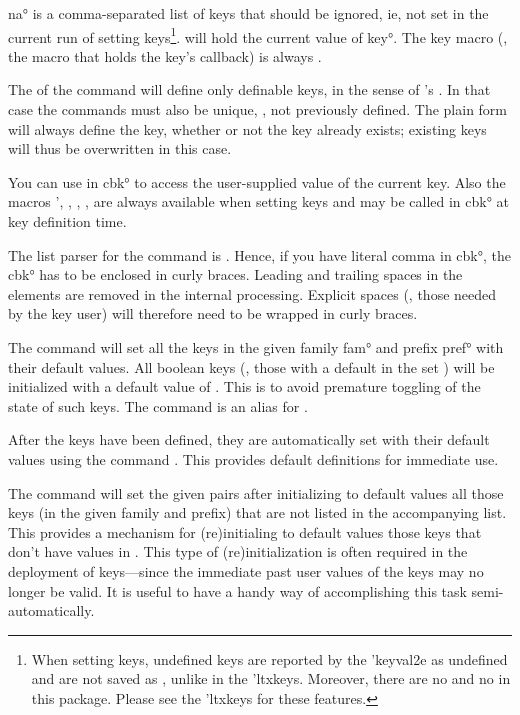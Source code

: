 \documentclass[
  use-a4-paper,
  use-10pt-font,
  final-version,
  use-UK-English,
  fancy-section-headings,
  frame-section-numbers,
  para-abstract-style,
  input-config-file,
  no-hyperref-messages
]{amltxdoc}
\begin{document}
\ang{na} is a comma-separated list of keys that should be ignored, ie, not set in the current run of setting keys\footnote{When setting keys, undefined keys are reported by the \pkg'{keyval2e} as undefined and are not saved as , unlike in the \pkg'{ltxkeys}. Moreover, there are no  and no  in this package. Please see the \pkg'{ltxkeys} for these features.}. \mpkey will hold the current value of \ang{key}. The key macro (\ie, the macro that holds the key's callback) is always \preffamkey.

The \stform of the command \fx{\kve@definekeys} will define only definable keys, in the sense of \latex's \hx{\newcommand}. In that case the commands \mpkey must also be unique, \ie, not previously defined. The plain form \fx{\kve@definekeys} will always define the key, whether or not the key already exists; existing keys will thus be overwritten in this case.

You can use  in \ang{cbk} to access the user-supplied value of the current key. Also the macros \ffx'{\currpref, \currfam, \currkey, \currval, \currkeyval} are always available when setting keys and may be called in \ang{cbk} at key definition time.

\Note The list parser for the command \fx{\kve@definekeys} is \qcomma. Hence, if you have literal comma in \ang{cbk}, the \ang{cbk} has to be enclosed in curly braces. Leading and trailing spaces in the elements are removed in the internal processing. Explicit spaces (\ie, those needed by the key user) will therefore need to be wrapped in curly braces.

The command \fx{\kve@setdefaults} will set all the keys in the given family \ang{fam} and prefix \ang{pref} with their default values. All boolean keys (\ie, those with a default in the set ) will be initialized with a default value of . This is to avoid premature toggling of the state of such keys. The command \fxis{\kve@setwithdefaults}{\kve@setdefaults} is an alias for \fx{\kve@setdefaults}.

\Note After the keys have been defined, they are automatically set with their default values using the command \fx{\kve@setdefaults}. This provides default definitions for immediate use.

The command \fx{\kve@setafterdefaults} will set the given \keyval pairs after initializing to default values all those keys (in the given family and prefix) that are not listed in the accompanying \keyval list. This provides a mechanism for (re)initialing to default values those keys that don't have values in \keyval. This type of (re)initialization is often required in the deployment of keys---since the immediate past user values of the keys may no longer be valid. It is useful to have a handy way of accomplishing this task semi-automatically.
\end{document}
